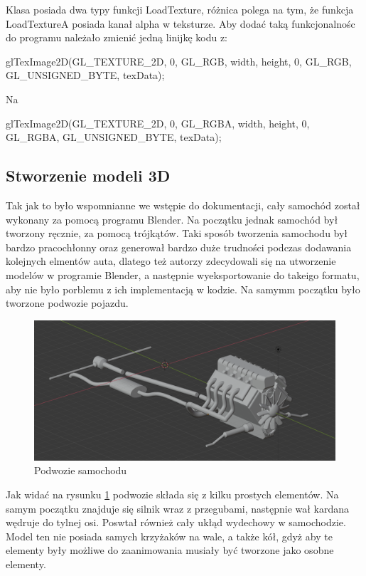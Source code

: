 \documentclass[a4paper,12pt]{article}
\numberwithin{equation}{section}
\begin{document}
Klasa posiada dwa typy funkcji LoadTexture, różnica polega na tym, że funkcja LoadTextureA posiada kanał alpha w teksturze. Aby dodać taką funkcjonalnośc do programu należało zmienić jedną linijkę kodu z:

\begin{cppcode}
	glTexImage2D(GL_TEXTURE_2D, 0, GL_RGB, width, height, 0, GL_RGB, GL_UNSIGNED_BYTE, texData);
\end{cppcode}
Na
\begin{cppcode}
	glTexImage2D(GL_TEXTURE_2D, 0, GL_RGBA, width, height, 0, GL_RGBA, GL_UNSIGNED_BYTE, texData);
\end{cppcode}
\subsection{Stworzenie modeli 3D}

Tak jak to było wspomnianne we wstępie do dokumentacji, cały samochód został wykonany za pomocą programu Blender. Na początku jednak samochód był tworzony ręcznie, za pomocą trójkątów. Taki sposób tworzenia samochodu był bardzo pracochłonny oraz generował bardzo duże trudności podczas dodawania kolejnych elmentów auta, dlatego też autorzy zdecydowali się na utworzenie modelów w programie Blender, a następnie wyeksportowanie do takeigo formatu, aby nie było porblemu z ich implementacją w kodzie. 
Na samymm początku było tworzone podwozie pojazdu.

\begin{figure}[H]
    \centering
    \includegraphics[width=\textwidth]{podwozie.png}
    \caption{Podwozie samochodu}
    \label{fig:podwozie}
\end{figure}

Jak widać na rysunku \ref{fig:podwozie} podwozie składa się z kilku  prostych elementów. Na samym początku znajduje się silnik wraz z przegubami, następnie wał kardana wędruje do tylnej osi. Poswtał również cały ukłąd wydechowy w samochodzie. Model ten nie posiada samych krzyżaków na wale, a także kół, gdyż aby te elementy były możliwe do zaanimowania musiały być tworzone jako osobne elementy. 
\end{document}
